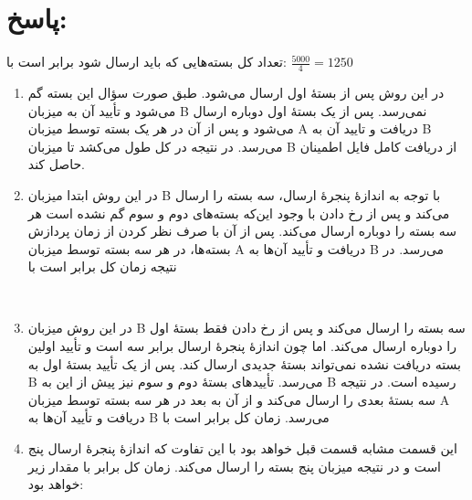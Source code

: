 \section*{پاسخ:}

تعداد کل بسته‌هایی که باید ارسال شود برابر است با: 
\(\frac{5000}{4}=1250\)


\begin{enumerate}
\begin{enumerate}
  \item در این روش پس از  بستهٔ اول ارسال می‌شود. طبق صورت سؤال این بسته گم می‌شود و تأیید آن به میزبان B نمی‌رسد. پس از یک  بستهٔ اول دوباره ارسال می‌شود و پس از آن در هر  یک بسته توسط میزبان A دریافت و تایید آن به B می‌رسد. در نتیجه در کل طول می‌کشد تا میزبان B از دریافت کامل فایل اطمینان حاصل کند.
  \begin{flushleft}
  \end{flushleft}

  \item در این روش ابتدا میزبان B با توجه به اندازهٔ پنجرهٔ ارسال، سه بسته را ارسال می‌کند و پس از رخ دادن  با وجود این‌که بسته‌های دوم و سوم گم نشده است هر سه بسته را دوباره ارسال می‌کند. پس از آن با صرف نظر کردن از زمان پردازش بسته‌ها، در هر  سه بسته توسط میزبان A دریافت و تأیید آن‌ها به B می‌رسد. در نتیجه زمان کل برابر است با
\begin{flushleft}
\\
 \end{flushleft}
  
  \item در این روش میزبان B سه بسته را ارسال می‌کند و پس از رخ دادن  فقط بستهٔ اول را دوباره ارسال می‌کند. اما چون اندازهٔ پنجرهٔ ارسال برابر سه است و تأیید اولین بسته دریافت نشده نمی‌تواند بستهٔ جدیدی ارسال کند. پس از یک  تأیید بستهٔ اول به B می‌رسد. تأییدهای بستهٔ دوم و سوم نیز پیش از این به B رسیده است. در نتیجه سه بستهٔ بعدی را ارسال می‌کند و از آن به بعد در هر  سه بسته توسط میزبان A دریافت و تأیید آن‌ها به B می‌رسد. زمان کل برابر است با
  \begin{flushleft}
\end{flushleft}
  
  \item این قسمت مشابه قسمت قبل خواهد بود با این تفاوت که اندازهٔ پنجرهٔ ارسال پنج است و در نتیجه میزبان پنج بسته را ارسال می‌کند. زمان کل برابر با مقدار زیر خواهد بود:
\begin{flushleft}
\end{flushleft}

\end{enumerate}
\end{enumerate}

